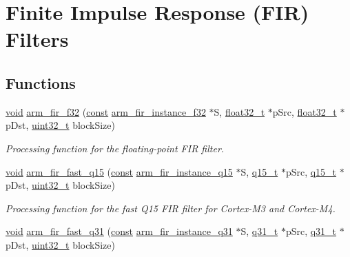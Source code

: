 \hypertarget{group___f_i_r}{\section{Finite Impulse Response (F\-I\-R) Filters}
\label{group___f_i_r}
}
\subsection*{Functions}
\begin{DoxyCompactItemize}
\item 
\hyperlink{group___n_a_m_e_ga18028b8badbf1ea7e704ccac3c488e82}{void} \hyperlink{group___f_i_r_gae8fb334ea67eb6ecbd31824ddc14cd6a}{arm\-\_\-fir\-\_\-f32} (\hyperlink{group___n_a_m_e_ga7ae6d0e43244213b34de2c2b9aa30da6}{const} \hyperlink{structarm__fir__instance__f32}{arm\-\_\-fir\-\_\-instance\-\_\-f32} $\ast$S, \hyperlink{arm__math_8h_a4611b605e45ab401f02cab15c5e38715}{float32\-\_\-t} $\ast$p\-Src, \hyperlink{arm__math_8h_a4611b605e45ab401f02cab15c5e38715}{float32\-\_\-t} $\ast$p\-Dst, \hyperlink{stdint_8h_a435d1572bf3f880d55459d9805097f62}{uint32\-\_\-t} block\-Size)
\begin{DoxyCompactList}\small\item\em Processing function for the floating-\/point F\-I\-R filter. \end{DoxyCompactList}\item 
\hyperlink{group___n_a_m_e_ga18028b8badbf1ea7e704ccac3c488e82}{void} \hyperlink{group___f_i_r_gac7d35e9472e49ccd88800f37f3476bd3}{arm\-\_\-fir\-\_\-fast\-\_\-q15} (\hyperlink{group___n_a_m_e_ga7ae6d0e43244213b34de2c2b9aa30da6}{const} \hyperlink{structarm__fir__instance__q15}{arm\-\_\-fir\-\_\-instance\-\_\-q15} $\ast$S, \hyperlink{arm__math_8h_ab5a8fb21a5b3b983d5f54f31614052ea}{q15\-\_\-t} $\ast$p\-Src, \hyperlink{arm__math_8h_ab5a8fb21a5b3b983d5f54f31614052ea}{q15\-\_\-t} $\ast$p\-Dst, \hyperlink{stdint_8h_a435d1572bf3f880d55459d9805097f62}{uint32\-\_\-t} block\-Size)
\begin{DoxyCompactList}\small\item\em Processing function for the fast Q15 F\-I\-R filter for Cortex-\/\-M3 and Cortex-\/\-M4. \end{DoxyCompactList}\item 
\hyperlink{group___n_a_m_e_ga18028b8badbf1ea7e704ccac3c488e82}{void} \hyperlink{group___f_i_r_ga55aa292e057b43c376428ea1d9a938cc}{arm\-\_\-fir\-\_\-fast\-\_\-q31} (\hyperlink{group___n_a_m_e_ga7ae6d0e43244213b34de2c2b9aa30da6}{const} \hyperlink{structarm__fir__instance__q31}{arm\-\_\-fir\-\_\-instance\-\_\-q31} $\ast$S, \hyperlink{arm__math_8h_adc89a3547f5324b7b3b95adec3806bc0}{q31\-\_\-t} $\ast$p\-Src, \hyperlink{arm__math_8h_adc89a3547f5324b7b3b95adec3806bc0}{q31\-\_\-t} $\ast$p\-Dst, \hyperlink{stdint_8h_a435d1572bf3f880d55459d9805097f62}{uint32\-\_\-t} block\-Size)

\end{DoxyCompactItemize}
